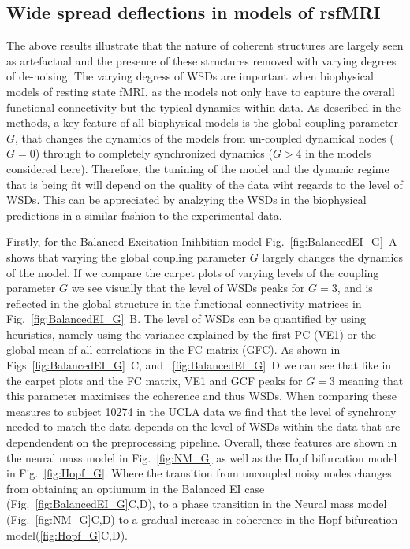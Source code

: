 \documentclass[oneside]{zHenriquesLab-StyleBioRxiv}
\begin{document}
\subsection*{Wide spread deflections in models of rsfMRI}

The above results illustrate that the nature of coherent structures are largely seen as artefactual and the presence of these structures removed with varying degrees of de-noising. The varying degress of WSDs are important when biophysical models of resting state fMRI, as the models not only have to capture the overall functional connectivity but the typical dynamics within data. As described in the methods, a key feature of all biophysical models is the global coupling parameter $G$, that changes the dynamics of the models from un-coupled dynamical nodes ($G=0$) through to completely synchronized dynamics ($G>4$ in the models considered here). Therefore, the tunining of the model and the dynamic regime that is being fit will depend on the quality of the data wiht regards to the level of WSDs. This can be appreciated by analzying the WSDs in the biophysical predictions in a similar fashion to the experimental data.

Firstly, for the Balanced Excitation Inihbition model Fig.~\ref{fig:BalancedEI_G}~A shows that varying the global coupling parameter $G$ largely changes the dynamics of the model. If we compare the carpet plots of varying levels of the coupling parameter $G$ we see visually that the level of WSDs peaks for $G=3$, and is reflected in the global structure in the functional connectivity matrices in Fig.~\ref{fig:BalancedEI_G}~B. The level of WSDs can be quantified by using heuristics, namely using the variance explained by the first PC (VE1) or the global mean of all correlations in the FC matrix (GFC). As shown in Figs~\ref{fig:BalancedEI_G}~C, and ~\ref{fig:BalancedEI_G}~D we can see that like in the carpet plots and the FC matrix, VE1 and GCF peaks for $G=3$ meaning that this parameter maximises the coherence and thus WSDs. When comparing these measures to subject 10274 in the UCLA data we find that the level of synchrony needed to match the data depends on the level of WSDs within the data that are dependendent on the preprocessing pipeline. Overall, these features are shown in the neural mass model in Fig.~\ref{fig:NM_G} as well as the Hopf bifurcation model in Fig.~\ref{fig:Hopf_G}. Where the transition from uncoupled noisy nodes changes from obtaining an optiumum in the Balanced EI case (Fig.~\ref{fig:BalancedEI_G}C,D), to a phase transition in the Neural mass model (Fig.~\ref{fig:NM_G}C,D) to a gradual increase in coherence in the Hopf bifurcation model(\ref{fig:Hopf_G}C,D). 
\end{document}
